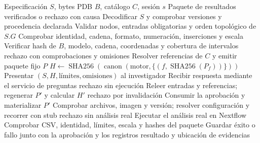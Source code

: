 \begin{algorithm}[t]
\caption{Composición TRP con aprobación vinculada al contenido}
\label{alg:trp-aprobacion}
\begin{algorithmic}[1]
\Require Especificación $S$, bytes PDB $B$, catálogo $C$, sesión $s$
\Ensure Paquete de resultados verificados o rechazo con causa
\State Decodificar $S$ y comprobar versiones y procedencia declarada
\State Validar nodos, entradas obligatorias y orden topológico de $S.G$
  \State Comprobar identidad, cadena, formato, numeración, inserciones y escala
\EndFor
\State Verificar hash de $B$, modelo, cadena, coordenadas y cobertura de intervalos
  \State \Return rechazo con comprobaciones y omisiones
\EndIf
\State Resolver referencias de $C$ y emitir paquete fijo $P$
\State $H \gets \operatorname{SHA256}(\operatorname{canon}(\text{motor},\{(f,\operatorname{SHA256}(P_f))\}))$
\State Presentar $(S,H,\text{límites},\text{omisiones})$ al investigador
\State Recibir respuesta mediante el servicio de preguntas
  \State \Return rechazo sin ejecución
\EndIf
\State Releer entradas y referencias; regenerar $P'$ y calcular $H'$
  \State \Return rechazo por invalidación
\EndIf
\State Consumir la aprobación y materializar $P'$
\State Comprobar archivos, imagen y versión; resolver configuración y recorrer con stub
  \State \Return rechazo sin análisis real
\EndIf
\State Ejecutar el análisis real en Nextflow
\State Comprobar CSV, identidad, límites, escala y hashes del paquete
\State Guardar éxito o fallo junto con la aprobación y los registros
\State \Return resultado y ubicación de evidencias
\end{algorithmic}
\end{algorithm}

